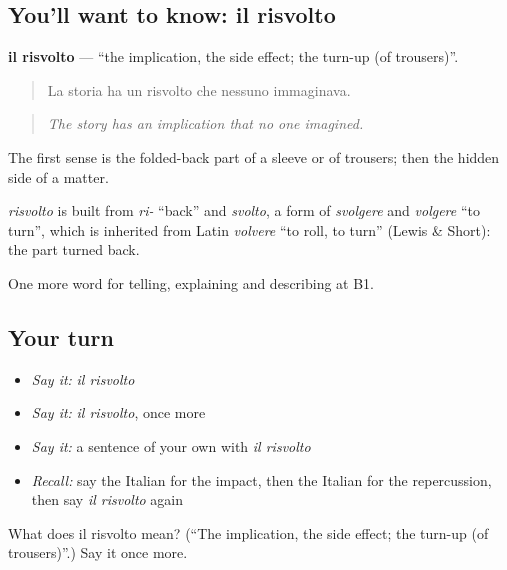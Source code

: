 \subsection*{You'll want to know: il risvolto}
\textbf{il risvolto} — \textquotedblleft{}the implication, the side effect; the turn-up (of trousers)\textquotedblright{}.

\begin{quote}
La storia ha un risvolto che nessuno immaginava.
\end{quote}

\begin{quote}
\emph{The story has an implication that no one imagined.}
\end{quote}

The first sense is the folded-back part of a sleeve or of trousers; then the hidden side of a matter.

\begin{cousinweb}
\emph{risvolto} is built from \emph{ri-} \textquotedblleft{}back\textquotedblright{} and \emph{svolto}, a form of \emph{svolgere} and \emph{volgere} \textquotedblleft{}to turn\textquotedblright{}, which is inherited from Latin \emph{volvere} \textquotedblleft{}to roll, to turn\textquotedblright{} (Lewis \& Short): the part turned back.
\end{cousinweb}

\begin{grammarlens}[title={What you've built}]
One more word for telling, explaining and describing at B1.
\end{grammarlens}

\subsection*{Your turn}
\begin{itemize}
\raggedright
  \item \emph{Say it:} \emph{il risvolto}
  \item \emph{Say it:} \emph{il risvolto}, once more
  \item \emph{Say it:} a sentence of your own with \emph{il risvolto}
  \item \emph{Recall:} say the Italian for the impact, then the Italian for the repercussion, then say \emph{il risvolto} again
\end{itemize}

\begin{tcolorbox}[breakable,colback=teal!4,colframe=teal!35!black,title={Before you move on}]
What does il risvolto mean? (\textquotedblleft{}The implication, the side effect; the turn-up (of trousers)\textquotedblright{}.) Say it once more.
\end{tcolorbox}
